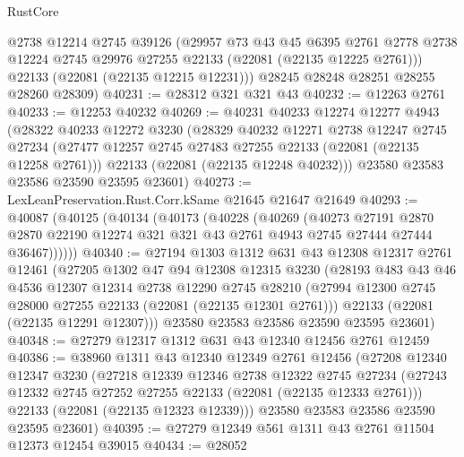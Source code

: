 \begin{lexlean}{RustCore}
\begin{coremodule}
        @2738
        @12214
        @2745
        @39126
        (@29957
          @73
          @43
          @45
          @6395
          @2761
          @2778
          @2738
          @12224
          @2745
          @29976
          @27255
          @22133
          (@22081 (@22135 @12225 @2761)))
        @22133
        (@22081 (@22135 @12215 @12231)))
      @28245
      @28248
      @28251
      @28255
      @28260
      @28309)
@40231 := @28312 @321 @321 @43
@40232 := @12263 @2761
@40233 := @12253 @40232
@40269 := @40231
    @40233
    @12274
    @12277
    @4943
    (@28322
      @40233
      @12272
      @3230
      (@28329
        @40232
        @12271
        @2738
        @12247
        @2745
        @27234
        (@27477 @12257 @2745 @27483 @27255 @22133 (@22081 (@22135 @12258 @2761)))
        @22133
        (@22081 (@22135 @12248 @40232)))
      @23580
      @23583
      @23586
      @23590
      @23595
      @23601)
@40273 := LexLeanPreservation.Rust.Corr.kSame @21645 @21647 @21649
@40293 := @40087
    (@40125
      (@40134
        (@40173
          (@40228
            (@40269
              (@40273
                @27191
                @2870
                @2870
                @22190
                @12274
                @321
                @321
                @43
                @2761
                @4943
                @2745
                @27444
                @27444
                @36467))))))
@40340 := @27194
    @1303
    @1312
    @631
    @43
    @12308
    @12317
    @2761
    @12461
    (@27205
      @1302
      @47
      @94
      @12308
      @12315
      @3230
      (@28193
        @483
        @43
        @46
        @4536
        @12307
        @12314
        @2738
        @12290
        @2745
        @28210
        (@27994 @12300 @2745 @28000 @27255 @22133 (@22081 (@22135 @12301 @2761)))
        @22133
        (@22081 (@22135 @12291 @12307)))
      @23580
      @23583
      @23586
      @23590
      @23595
      @23601)
@40348 := @27279 @12317 @1312 @631 @43 @12340 @12456 @2761 @12459
@40386 := @38960
    @1311
    @43
    @12340
    @12349
    @2761
    @12456
    (@27208
      @12340
      @12347
      @3230
      (@27218
        @12339
        @12346
        @2738
        @12322
        @2745
        @27234
        (@27243 @12332 @2745 @27252 @27255 @22133 (@22081 (@22135 @12333 @2761)))
        @22133
        (@22081 (@22135 @12323 @12339)))
      @23580
      @23583
      @23586
      @23590
      @23595
      @23601)
@40395 := @27279 @12349 @561 @1311 @43 @2761 @11504 @12373 @12454 @39015
@40434 := @28052

\end{coremodule}
\end{lexlean}
